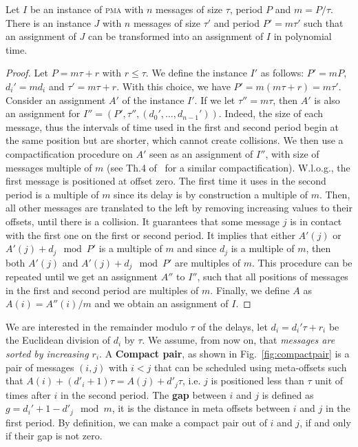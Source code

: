 \documentclass[a4paper,cleveref, autoref, thm-restate,UKenglish]{lipics-v2019}
\newcommand\pma{\textsc{pma}\xspace}
\begin{document}
\begin{lemma}\label{lemma:multiple}
Let $I$ be an instance of \pma with $n$ messages of size $\tau$, period $P$ and $m = P / \tau$. There is an instance $J$ with $n$ messages of size $\tau'$ and period $P'= m\tau'$ such that an assignment of $J$ can be transformed into an assignment of $I$ in polynomial time.
\end{lemma}
\begin{proof}
Let $P = m \tau + r$ with $r \leq \tau$. We define the instance $I'$ as follows: $P' = mP$, $d_{i}' = m d_i$ and $\tau' = m \tau + r$. With this choice, we have $P' = m(m \tau + r) = m \tau'$.
Consider an assignment $A'$ of the instance $I'$.
If we let $\tau'' = m\tau$, then $A'$ is also an assignment for $I'' = (P',\tau'',(d_{0}',\dots,d_{n-1}'))$. Indeed, the size of each message, thus the intervals of time used in the first and second period begin at the same position but are shorter, which cannot create collisions. We then use a compactification procedure on $A'$ seen as an assignment of $I''$,
with size of messages multiple of $m$ (see Th.4 of~\cite{dominique2018deterministic} for a similar compactification). W.l.o.g., the first message is positioned at offset zero. The first time it uses in the second period is a multiple of $m$ since its delay is by construction a multiple of $m$. Then, all other messages are translated to the left by removing increasing values to their offsets, until there is a collision. It guarantees that some message $j$ is in contact with the first one on the first or second period. It implies that either $A'(j)$ or $A'(j)+d_j \mod P'$ is a multiple of $m$ and since $d_j$ is a multiple of $m$, then both $A'(j)$ and $A'(j)+d_j \mod P'$ are multiples of $m$. This procedure can be repeated until we get an assignment $A''$ to $I''$, such that all positions of messages in the first and second period are multiples of $m$. Finally, we define $A$ as $A(i) = A''(i)/m$ and we obtain an assignment of $I$.
\end{proof}



We are interested in the remainder modulo $\tau$ of the delays, let $d_i = d_{i}'\tau + r_i$ be the Euclidean division of $d_i$ by $\tau$. We assume, from now on, that \emph{messages are sorted by increasing $r_i$}.
A \textbf{Compact pair}, as shown in Fig.~\ref{fig:compactpair} is a pair of messages $(i,j)$ with $i < j$ that can be scheduled using meta-offsets such that $A(i) + (d'_i+1)\tau = A(j) + d'_j\tau$, i.e. $j$ is positioned less than $\tau$ unit of times after $i$ in the second period.
The \textbf{gap} between $i$ and $j$ is defined as  $g = d_{i}' + 1 - d'_{j} \mod m$, it is the distance in meta offsets between $i$ and $j$ in the first period. By definition, we can make a compact pair out of $i$ and $j$, if and only if their gap is not zero.
\end{document}
